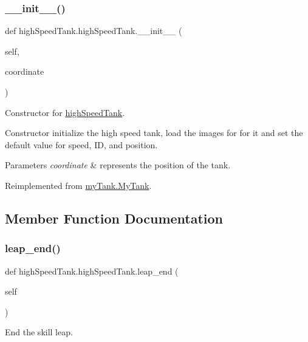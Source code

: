 \subsubsection{\texorpdfstring{\_\_init\_\_()}{\_\_init\_\_()}}
{\footnotesize\ttfamily def high\+Speed\+Tank.\+high\+Speed\+Tank.\+\_\+\+\_\+init\+\_\+\+\_\+ (\begin{DoxyParamCaption}\item[{}]{self,  }\item[{}]{coordinate }\end{DoxyParamCaption})}



Constructor for \mbox{\hyperlink{classhigh_speed_tank_1_1high_speed_tank}{high\+Speed\+Tank}}. 

Constructor initialize the high speed tank, load the images for for it and set the default value for speed, ID, and position. 
\begin{DoxyParams}{Parameters}
{\em coordinate} & represents the position of the tank. \\
\hline
\end{DoxyParams}


Reimplemented from \mbox{\hyperlink{classmy_tank_1_1_my_tank_a5a2b6c586c454d3801f6701a6befb7e5}{my\+Tank.\+My\+Tank}}.



\subsection{Member Function Documentation}
\mbox{\label{classhigh_speed_tank_1_1high_speed_tank_a36c678c940bfed5e3bcd3a58332775a2}} 
\subsubsection{\texorpdfstring{leap\_end()}{leap\_end()}}
{\footnotesize\ttfamily def high\+Speed\+Tank.\+high\+Speed\+Tank.\+leap\+\_\+end (\begin{DoxyParamCaption}\item[{}]{self }\end{DoxyParamCaption})}



End the skill leap. 

\mbox{\label{classhigh_speed_tank_1_1high_speed_tank_a3f0a53a666dc3c0ae1334fc919ec8c50}} 
